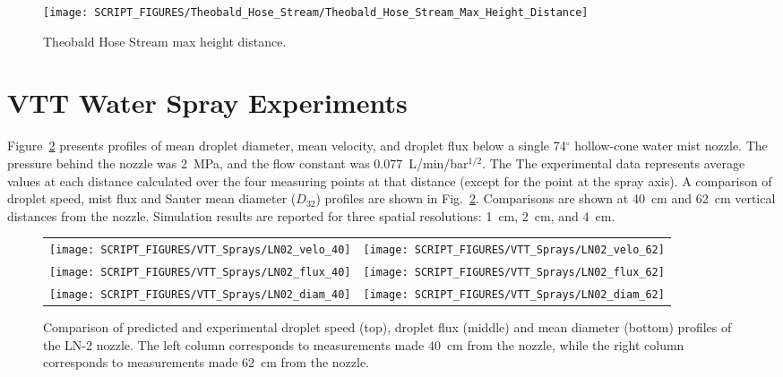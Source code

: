 \begin{figure}[h!]
\begin{center}
\texttt{[image: SCRIPT\_FIGURES/Theobald\_Hose\_Stream/Theobald\_Hose\_Stream\_Max\_Height\_Distance]}
\caption[Theobald Hose Stream max range]{Theobald Hose Stream max height distance.}
\label{fig:Theobald_max_height_distance}
\end{center}
\end{figure}


\clearpage

\section{VTT Water Spray Experiments}

Figure~\ref{LN02} presents profiles of mean droplet diameter, mean velocity, and droplet flux below a single 74$^\circ$ hollow-cone water mist nozzle. The pressure behind the nozzle was 2~MPa, and the flow constant was 0.077~L/min/bar$^{1/2}$. The The experimental data represents average values at each distance calculated over the four measuring points at that distance (except for the point at the spray axis). A comparison of droplet speed, mist flux and Sauter mean diameter ($D_{32}$) profiles are shown in Fig.~\ref{LN02}. Comparisons are shown at 40~cm and 62~cm vertical distances from the nozzle. Simulation results are reported for three spatial resolutions: 1~cm, 2~cm, and 4~cm.

\begin{figure}
\begin{tabular*}{\textwidth}{l@{\extracolsep{\fill}}r}
\texttt{[image: SCRIPT\_FIGURES/VTT\_Sprays/LN02\_velo\_40]} &
\texttt{[image: SCRIPT\_FIGURES/VTT\_Sprays/LN02\_velo\_62]}  \\
\texttt{[image: SCRIPT\_FIGURES/VTT\_Sprays/LN02\_flux\_40]} &
\texttt{[image: SCRIPT\_FIGURES/VTT\_Sprays/LN02\_flux\_62]}  \\
\texttt{[image: SCRIPT\_FIGURES/VTT\_Sprays/LN02\_diam\_40]} &
\texttt{[image: SCRIPT\_FIGURES/VTT\_Sprays/LN02\_diam\_62]}  \\
\end{tabular*}
\caption[Droplet speed, flux, and mean diameter profiles of the LN-2 nozzle]{Comparison of predicted and experimental droplet speed (top), droplet flux (middle) and mean diameter (bottom) profiles of the LN-2 nozzle. The left column corresponds to measurements made 40~cm from the nozzle, while the right column corresponds to measurements made 62~cm from the nozzle.}
\label{LN02}
\end{figure}

